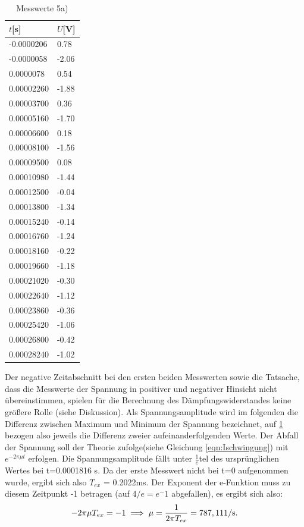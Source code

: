 \begin{table}
\noindent
\centering
\caption{Messwerte 5a)}
\label{tab:5a}
\begin{tabular}{ll}
\toprule
{$t$[s]} & {$U$[V]} \\
\midrule
-0.0000206 & 0.78 \\
-0.0000058 & -2.06 \\
0.0000078 & 0.54 \\
0.00002260 & -1.88 \\
0.00003700 & 0.36 \\
0.00005160 & -1.70 \\
0.00006600 & 0.18 \\
0.00008100 & -1.56 \\
0.00009500 & 0.08 \\
0.00010980 & -1.44 \\
0.00012500 & -0.04 \\
0.00013800 & -1.34 \\
0.00015240 & -0.14 \\
0.00016760 & -1.24 \\
0.00018160 & -0.22 \\
0.00019660 & -1.18 \\
0.00021020 & -0.30 \\
0.00022640 & -1.12 \\
0.00023860 & -0.36 \\
0.00025420 & -1.06 \\
0.00026800 & -0.42 \\
0.00028240 & -1.02 \\
\bottomrule
\end{tabular}
\end{table}

Der negative Zeitabschnitt bei den ersten beiden Messwerten
sowie die Tatsache, dass
die Messwerte der Spannung
in positiver und negativer Hinsicht nicht übereinstimmen,
spielen für die Berechnung des Dämpfungswiderstandes keine größere Rolle
(siehe Diskussion).
Als Spannungsamplitude wird im folgenden die Differenz zwischen Maximum und
Minimum der Spannung bezeichnet, auf \ref{tab:5a} bezogen also jeweils die
Differenz zweier aufeinanderfolgenden Werte.
Der Abfall der Spannung soll der Theorie
zufolge(siehe Gleichung \ref{eqn:Ischwingung})
mit $e^{-2\pi\mu t}$ erfolgen. Die Spannungsamplitude fällt unter
$\frac{1}{e}$tel des ursprünglichen Wertes bei t=0.0001816 s.
Da der erste Messwert
nicht bei t=0 aufgenommen wurde, ergibt sich also $T_{ex}$ = 0.2022ms.
Der Exponent der e-Funktion muss zu diesem Zeitpunkt -1 betragen (auf 4$/e=e^-1$
abgefallen), es ergibt sich also:
\begin{equation}
  -2\pi\mu T_{ex} = -1 \\
  \implies \mu = \frac{1}{2\pi T_{ex}} = 787,11 \text{1/s.}
\end{equation}

